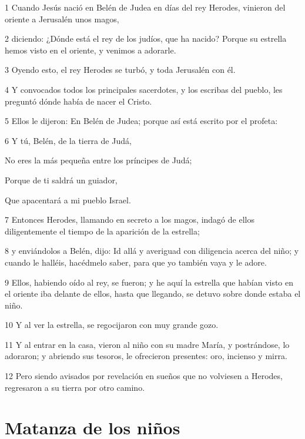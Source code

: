 \par 1 Cuando Jesús nació en Belén de Judea en días del rey Herodes, vinieron del oriente a Jerusalén unos magos,
\par 2 diciendo: ¿Dónde está el rey de los judíos, que ha nacido? Porque su estrella hemos visto en el oriente, y venimos a adorarle.
\par 3 Oyendo esto, el rey Herodes se turbó, y toda Jerusalén con él.
\par 4 Y convocados todos los principales sacerdotes, y los escribas del pueblo, les preguntó dónde había de nacer el Cristo.
\par 5 Ellos le dijeron: En Belén de Judea; porque así está escrito por el profeta:
\par 6 Y tú, Belén, de la tierra de Judá,
\par No eres la más pequeña entre los príncipes de Judá;
\par Porque de ti saldrá un guiador,
\par Que apacentará a mi pueblo Israel.
\par 7 Entonces Herodes, llamando en secreto a los magos, indagó de ellos diligentemente el tiempo de la aparición de la estrella;
\par 8 y enviándolos a Belén, dijo: Id allá y averiguad con diligencia acerca del niño; y cuando le halléis, hacédmelo saber, para que yo también vaya y le adore.
\par 9 Ellos, habiendo oído al rey, se fueron; y he aquí la estrella que habían visto en el oriente iba delante de ellos, hasta que llegando, se detuvo sobre donde estaba el niño.
\par 10 Y al ver la estrella, se regocijaron con muy grande gozo.
\par 11 Y al entrar en la casa, vieron al niño con su madre María, y postrándose, lo adoraron; y abriendo sus tesoros, le ofrecieron presentes: oro, incienso y mirra.
\par 12 Pero siendo avisados por revelación en sueños que no volviesen a Herodes, regresaron a su tierra por otro camino.

\section*{Matanza de los niños}

